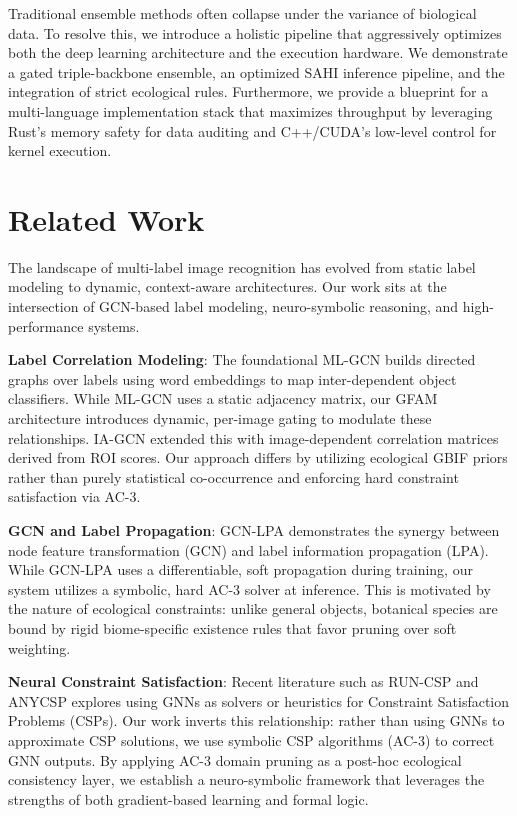 \documentclass[10pt,twocolumn,letterpaper]{article}
\begin{document}
Traditional ensemble methods often collapse under the variance of biological data. To resolve this, we introduce a holistic pipeline that aggressively optimizes both the deep learning architecture and the execution hardware. We demonstrate a gated triple-backbone ensemble, an optimized SAHI inference pipeline, and the integration of strict ecological rules. Furthermore, we provide a blueprint for a multi-language implementation stack that maximizes throughput by leveraging Rust's memory safety for data auditing and C++/CUDA's low-level control for kernel execution.

\section{Related Work}

The landscape of multi-label image recognition has evolved from static label modeling to dynamic, context-aware architectures. Our work sits at the intersection of GCN-based label modeling, neuro-symbolic reasoning, and high-performance systems.

\textbf{Label Correlation Modeling}: The foundational ML-GCN \cite{mlgcn} builds directed graphs over labels using word embeddings to map inter-dependent object classifiers. While ML-GCN uses a static adjacency matrix, our GFAM architecture introduces dynamic, per-image gating to modulate these relationships. IA-GCN \cite{iagcn} extended this with image-dependent correlation matrices derived from ROI scores. Our approach differs by utilizing ecological GBIF priors rather than purely statistical co-occurrence and enforcing hard constraint satisfaction via AC-3.

\textbf{GCN and Label Propagation}: GCN-LPA \cite{gcnlpa} demonstrates the synergy between node feature transformation (GCN) and label information propagation (LPA). While GCN-LPA uses a differentiable, soft propagation during training, our system utilizes a symbolic, hard AC-3 solver at inference. This is motivated by the nature of ecological constraints: unlike general objects, botanical species are bound by rigid biome-specific existence rules that favor pruning over soft weighting.

\textbf{Neural Constraint Satisfaction}: Recent literature such as RUN-CSP \cite{runcsp} and ANYCSP \cite{anycsp} explores using GNNs as solvers or heuristics for Constraint Satisfaction Problems (CSPs). Our work inverts this relationship: rather than using GNNs to approximate CSP solutions, we use symbolic CSP algorithms (AC-3) to correct GNN outputs. By applying AC-3 domain pruning as a post-hoc ecological consistency layer, we establish a neuro-symbolic framework that leverages the strengths of both gradient-based learning and formal logic.
\end{document}
